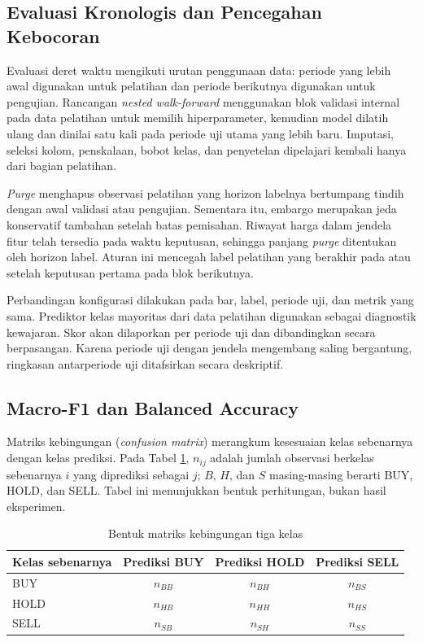 \subsection{Evaluasi Kronologis dan Pencegahan Kebocoran}

Evaluasi deret waktu mengikuti urutan penggunaan data: periode yang lebih awal digunakan untuk pelatihan dan periode berikutnya digunakan untuk pengujian. Rancangan \emph{nested walk-forward} menggunakan blok validasi internal pada data pelatihan untuk memilih hiperparameter, kemudian model dilatih ulang dan dinilai satu kali pada periode uji utama yang lebih baru. Imputasi, seleksi kolom, penskalaan, bobot kelas, dan penyetelan dipelajari kembali hanya dari bagian pelatihan.

\emph{Purge} menghapus observasi pelatihan yang horizon labelnya bertumpang tindih dengan awal validasi atau pengujian. Sementara itu, embargo merupakan jeda konservatif tambahan setelah batas pemisahan. Riwayat harga dalam jendela fitur telah tersedia pada waktu keputusan, sehingga panjang \emph{purge} ditentukan oleh horizon label. Aturan ini mencegah label pelatihan yang berakhir pada atau setelah keputusan pertama pada blok berikutnya.

Perbandingan konfigurasi dilakukan pada bar, label, periode uji, dan metrik yang sama. Prediktor kelas mayoritas dari data pelatihan digunakan sebagai diagnostik kewajaran. Skor akan dilaporkan per periode uji dan dibandingkan secara berpasangan. Karena periode uji dengan jendela mengembang saling bergantung, ringkasan antarperiode uji ditafsirkan secara deskriptif.

\subsection{Macro-F1 dan Balanced Accuracy}

Matriks kebingungan (\emph{confusion matrix}) merangkum kesesuaian kelas sebenarnya dengan kelas prediksi. Pada Tabel \ref{tab:confusion-tiga-kelas}, $n_{ij}$ adalah jumlah observasi berkelas sebenarnya $i$ yang diprediksi sebagai $j$; $B$, $H$, dan $S$ masing-masing berarti BUY, HOLD, dan SELL. Tabel ini menunjukkan bentuk perhitungan, bukan hasil eksperimen.

\begin{table}[htbp]
\centering\caption{Bentuk matriks kebingungan tiga kelas}\label{tab:confusion-tiga-kelas}
\begin{tabular}{lccc}\hline
Kelas sebenarnya & Prediksi BUY & Prediksi HOLD & Prediksi SELL\\\hline
BUY & $n_{BB}$ & $n_{BH}$ & $n_{BS}$\\
HOLD & $n_{HB}$ & $n_{HH}$ & $n_{HS}$\\
SELL & $n_{SB}$ & $n_{SH}$ & $n_{SS}$\\\hline
\end{tabular}
\end{table}

